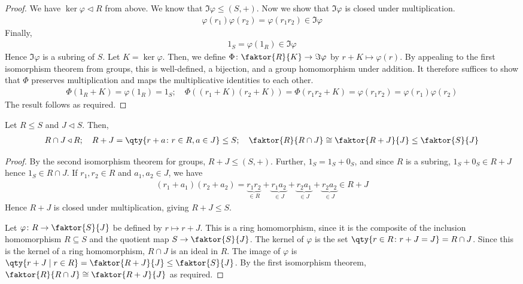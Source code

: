 \begin{proof}
	We have $\ker \varphi \triangleleft R$ from above.
	We know that $\Im \varphi \leq (S, +)$.
	Now we show that $\Im \varphi$ is closed under multiplication.
	\begin{align*}
		\varphi(r_1) \varphi(r_2) = \varphi(r_1 r_2) \in \Im \varphi
	\end{align*}
	Finally,
	\begin{align*}
		1_S = \varphi(1_R) \in \Im \varphi
	\end{align*}
	Hence $\Im \varphi$ is a subring of $S$.
	Let $K = \ker \varphi$.
	Then, we define $\Phi \colon \faktor{R}{K} \to \Im \varphi$ by $r+K \mapsto \varphi(r)$.
	By appealing to the first isomorphism theorem from groups, this is well-defined, a bijection, and a group homomorphism under addition.
	It therefore suffices to show that $\Phi$ preserves multiplication and maps the multiplicative identities to each other.
	\begin{align*}
		\Phi(1_R + K) = \varphi(1_R) = 1_S;\quad \Phi((r_1+K)(r_2+K)) = \Phi(r_1 r_2 +K) = \varphi(r_1 r_2) = \varphi(r_1) \varphi(r_2)
	\end{align*}
	The result follows as required.
\end{proof}
\begin{theorem}
	Let $R \leq S$ and $J \triangleleft S$.
	Then,
	\begin{align*}
		R \cap J \triangleleft R;\quad R + J = \qty{r+a \colon r\in R, a \in J} \leq S;\quad \faktor{R}{R \cap J} \cong \faktor{R+J}{J} \leq \faktor{S}{J}
	\end{align*}
\end{theorem}
\begin{proof}
	By the second isomorphism theorem for groups, $R+J \leq (S, +)$.
	Further, $1_S = 1_S + 0_S$, and since $R$ is a subring, $1_S + 0_S \in R + J$ hence $1_S \in R \cap J$.
	If $r_1, r_2 \in R$ and $a_1, a_2 \in J$, we have
	\begin{align*}
		(r_1 + a_1)(r_2 + a_2) = \underbrace{r_1 r_2}_{\in R} + \underbrace{r_1 a_2}_{\in J} + \underbrace{r_2 a_1}_{\in J} + \underbrace{r_2 a_2}_{\in J} \in R + J
	\end{align*}
	Hence $R+J$ is closed under multiplication, giving $R+J \leq S$.

	Let $\varphi \colon R \to \faktor{S}{J}$ be defined by $r \mapsto r + J$.
	This is a ring homomorphism, since it is the composite of the inclusion homomorphism $R \subseteq S$ and the quotient map $S \to \faktor{S}{J}$.
	The kernel of $\varphi$ is the set $\qty{r \in R \colon r+J = J} = R \cap J$.
	Since this is the kernel of a ring homomorphism, $R \cap J$ is an ideal in $R$.
	The image of $\varphi$ is $\qty{r+J \mid r \in R} = \faktor{R+J}{J} \leq \faktor{S}{J}$.
	By the first isomorphism theorem, $\faktor{R}{R \cap J} \cong \faktor{R+J}{J}$ as required.
\end{proof}
